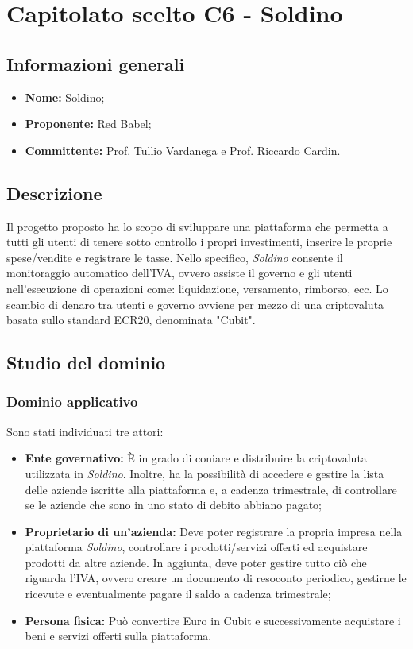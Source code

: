 \section{Capitolato scelto C6 - Soldino}
\subsection{Informazioni generali}
% 
\begin{itemize}
\item
\textbf{Nome:} Soldino;
\item
\textbf{Proponente:} Red Babel;
\item
\textbf{Committente:} Prof. Tullio Vardanega e Prof. Riccardo Cardin.
\end{itemize}

\subsection{Descrizione}
Il progetto proposto ha lo scopo di sviluppare una piattaforma che permetta a 
tutti gli utenti di tenere sotto controllo i propri investimenti, inserire le 
proprie spese/vendite e registrare le tasse. Nello specifico, \textit{Soldino} 
consente il monitoraggio automatico dell'IVA, ovvero assiste il governo e gli 
utenti nell'esecuzione di operazioni come: liquidazione, versamento, rimborso, 
ecc. Lo scambio di denaro tra utenti e governo avviene per mezzo di una 
criptovaluta basata sullo standard ECR20\glo{}, denominata "Cubit"\glo{}. 


\subsection{Studio del dominio}
\subsubsection{Dominio applicativo}
Sono stati individuati tre attori:
\begin{itemize}	
	\item \textbf{Ente governativo: }\`E in grado di coniare e distribuire la 
	criptovaluta utilizzata in \textit{Soldino}. Inoltre, ha la possibilità di accedere e gestire la lista delle aziende iscritte alla piattaforma e, a cadenza trimestrale, di controllare se le aziende che sono in uno stato di debito abbiano pagato;
	\item \textbf{Proprietario di un'azienda:} Deve poter registrare la propria 
impresa nella piattaforma \textit{Soldino}, controllare i prodotti/servizi 
offerti ed acquistare 
prodotti da altre aziende. In aggiunta, deve poter gestire tutto ciò che 
riguarda l'IVA, ovvero creare un documento di resoconto periodico,
gestirne le ricevute e eventualmente pagare il saldo a cadenza trimestrale;
	\item \textbf{Persona fisica\glo: }Può convertire Euro in Cubit e 
successivamente acquistare i beni e servizi offerti sulla piattaforma. 
\end{itemize}
